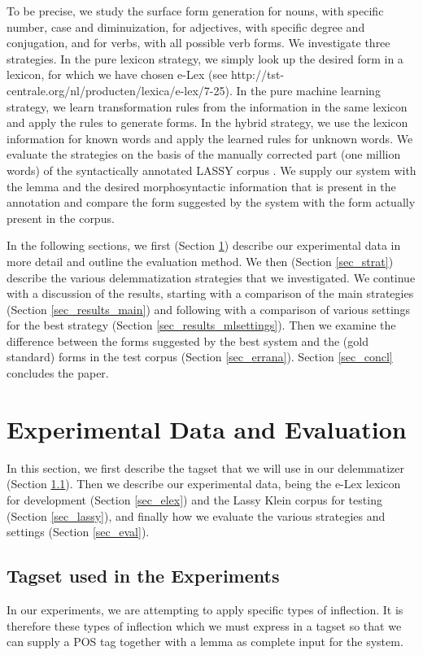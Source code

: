 \documentclass[a4paper,10pt,twoside]{article}
\begin{document}
To be precise, we study the surface form generation for nouns, with specific number, case and diminuization, for adjectives, with specific degree and conjugation, and for verbs, with all possible verb forms. We investigate three strategies. In the pure lexicon strategy, we simply look up the desired form in a lexicon, for which we have chosen e-Lex (see http://tst-centrale.org/nl/producten/\allowbreak lexica/e-lex/7-25). In the pure machine learning strategy, we learn transformation rules from the information in the same lexicon and apply the rules to generate forms. In the hybrid strategy, we use the lexicon information for known words and apply the learned rules for unknown words. We evaluate the strategies on the basis of the manually corrected part (one million words) of the syntactically annotated LASSY corpus \cite{REFlassy}. We supply our system with the lemma and the desired morphosyntactic information that is present in the annotation and compare the form suggested by the system with the form actually present in the corpus. 

In the following sections, we first (Section \ref{sec_method}) describe our experimental data in more detail and outline the evaluation method. We then (Section \ref{sec_strat}) describe the various delemmatization strategies that we investigated. We continue with a discussion of the results, starting with a comparison of the main strategies (Section \ref{sec_results_main}) and following with a comparison of various settings for the best strategy (Section \ref{sec_results_mlsettings}). Then we examine the difference between the forms suggested by the best system and the (gold standard) forms in the test corpus (Section \ref{sec_errana}). Section \ref{sec_concl} concludes the paper.


\section{Experimental Data and Evaluation}
\label{sec_method}

In this section, we first describe the tagset that we will use in our delemmatizer (Section \ref{sec_tagset}). Then we describe our experimental data, being the e-Lex lexicon for development (Section \ref{sec_elex}) and the Lassy Klein corpus for testing (Section \ref{sec_lassy}), and finally how we evaluate the various strategies and settings (Section \ref{sec_eval}).

\subsection{Tagset used in the Experiments}
\label{sec_tagset}
In our experiments, we are attempting to apply specific types of inflection. It is therefore these types of inflection which we must express in a tagset so that we can supply a POS tag together with a lemma as complete input for the system. 
\end{document}
